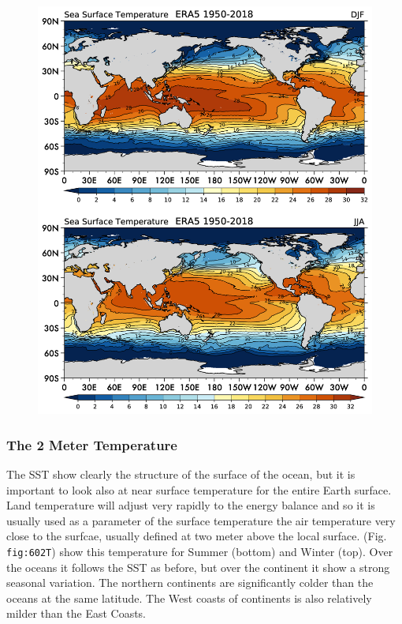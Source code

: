 \begin{figure}
	\centering
	\includegraphics[width = .7 \textwidth]{figs/GD/SST.png}
	\caption{}\label{}
\end{figure}

\subsubsection{The 2 Meter Temperature}\label{the-2-meter-temperature}

The SST show clearly the structure of the surface of the ocean, but it
is important to look also at near surface temperature for the entire
Earth surface. Land temperature will adjust very rapidly to the energy
balance and so it is usually used as a parameter of the surface
temperature the air temperature very close to the surfcae, usually
defined at two meter above the local surface. (Fig. \texttt{fig:602T})
show this temperature for Summer (bottom) and Winter (top). Over the
oceans it follows the SST as before, but over the continent it show a
strong seasonal variation. The northern continents are significantly
colder than the oceans at the same latitude. The West coasts of
continents is also relatively milder than the East Coasts.

